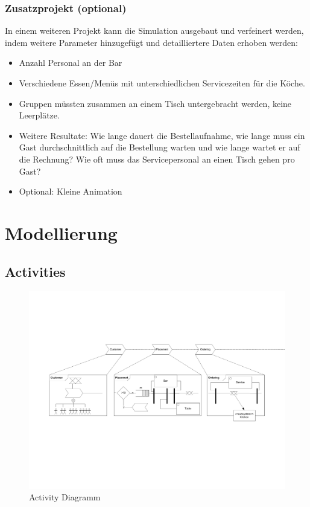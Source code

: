 \documentclass[ngerman,a4paper,12pt]{scrreprt}
\begin{document}
\subsection{Zusatzprojekt (optional)}
	In einem weiteren Projekt kann die Simulation ausgebaut und verfeinert werden, indem weitere Parameter hinzugefügt  und detailliertere Daten erhoben werden:
	\begin{itemize}
		\item Anzahl Personal an der Bar
		\item Verschiedene Essen/Menüs mit unterschiedlichen Servicezeiten für die Köche.
		\item Gruppen müssten zusammen an einem Tisch untergebracht werden, keine Leerplätze.
		\item Weitere Resultate: Wie lange dauert die Bestellaufnahme, wie lange muss ein Gast durchschnittlich auf die Bestellung warten und wie lange wartet er auf die Rechnung? Wie oft muss das Servicepersonal an einen Tisch gehen pro Gast?
		\item Optional: Kleine Animation
	\end{itemize}


\chapter{Modellierung}
	\section{Activities}
		\begin{figure}[H]
			\centering
				\includegraphics[page=4,trim=1cm 3cm 2.5cm 1cm, clip=true,width=\textwidth]{../model/Modell_v2.pdf}
				\caption[Activity Diagramm]{Activity Diagramm}
				\label{activityDiagramm}
		\end{figure}
		
\end{document}
